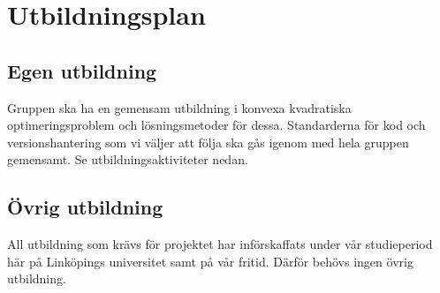 \section{Utbildningsplan}

\subsection{Egen utbildning}
Gruppen ska ha en gemensam utbildning i konvexa kvadratiska optimeringsproblem och lösningsmetoder för dessa. Standarderna för kod och versionshantering som vi väljer att följa ska gås igenom med hela gruppen gemensamt. Se utbildningsaktiviteter nedan. 

\subsection{Övrig utbildning}
All utbildning som krävs för projektet har införskaffats under vår studieperiod här på Linköpings universitet samt på vår fritid. Därför behövs ingen övrig utbildning.
